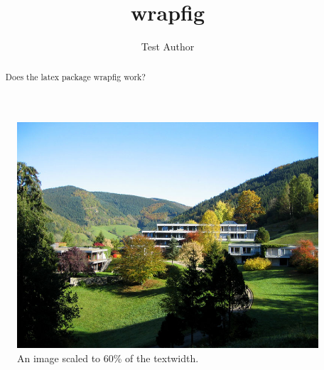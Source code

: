 \documentclass{snapshotmfo}
\author{Test Author}
\title{wrapfig}
\begin{document}
\begin{abstract}
Does the latex package wrapfig work?
\end{abstract}

\begin{figure}
\centering
\includegraphics[width= 0.6 \textwidth]{mfo.jpg}
\caption{An image scaled to 60\% of the textwidth.}
\end{figure}

\lipsum[1]
\end{document}
